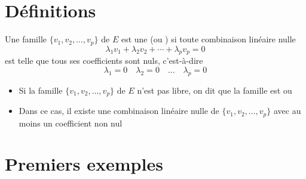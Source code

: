 \section{Définitions}


\begin{frame}
\begin{mydefinition}

Une famille {$\{ v_1, v_2,\ldots, v_p \}$} de $E$ est une  (ou 
) si toute combinaison linéaire nulle
{$$\lambda_1 v_1+\lambda_2 v_2+\cdots+\lambda_p v_p=0$$}est telle que tous ses coefficients sont nuls, c'est-à-dire 
{$$\lambda_1=0 \quad \lambda_2=0 \quad \ldots \quad \lambda_p=0$$}
\vspace*{-3ex}
\end{mydefinition}

\pause\pause\pause\pause

\begin{remarque}
\begin{itemize}
\item
Si la famille $\{ v_1, v_2,\ldots, v_p \}$ de $E$ n'est pas libre, on dit que la famille est  ou 
\pause
\item 
Dans ce cas, il existe une combinaison lin\'eaire nulle de $\{ v_1, v_2,\ldots, v_p \}$ avec {au moins un coefficient non nul}
\end{itemize}
\end{remarque}


\end{frame}


\section{Premiers exemples}


